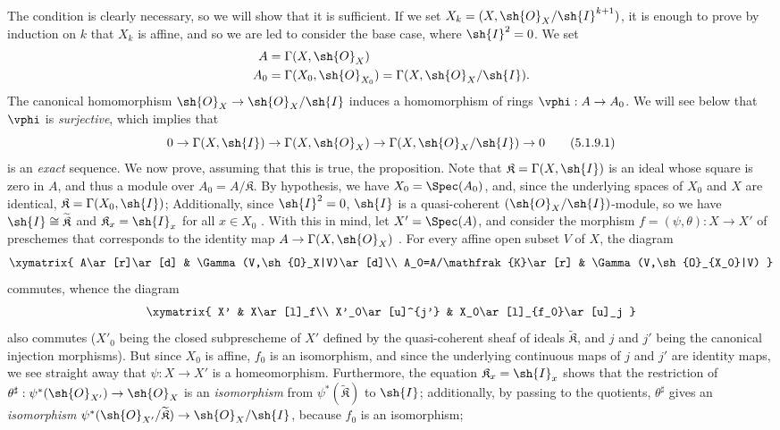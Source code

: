 The condition is clearly necessary, so we will show that it is sufficient.
If we set $X_k=(X,\sh{O}_X/\sh{I}^{k+1})$, it is enough to prove by induction on $k$ that $X_k$ is affine, and so we are led to consider the base case, where $\sh{I}^2=0$.
We set
\begin{align*}
  A&=\Gamma(X,\sh{O}_X)\\
  A_0&=\Gamma(X_0,\sh{O}_{X_0})=\Gamma(X,\sh{O}_X/\sh{I}).
\end{align*}
The canonical homomorphism $\sh{O}_X\to\sh{O}_X/\sh{I}$ induces a homomorphism of rings $\vphi:A\to A_0$.
We will see below that $\vphi$ is \emph{surjective}, which implies that
\[
\label{I.5.1.9.1}
  0\to\Gamma(X,\sh{I})\to\Gamma(X,\sh{O}_X)\to\Gamma(X,\sh{O}_X/\sh{I})\to 0\tag{5.1.9.1}
\]
is an \emph{exact} sequence.
We now prove, assuming that this is true, the proposition.
Note that $\mathfrak{K}=\Gamma(X,\sh{I})$ is an ideal whose square is zero in $A$, and thus a module over $A_0=A/\mathfrak{K}$.
By hypothesis, we have $X_0=\Spec(A_0)$, and, since the underlying spaces of $X_0$ and $X$ are identical, $\mathfrak{K}=\Gamma(X_0,\sh{I})$;
Additionally, since $\sh{I}^2=0$, $\sh{I}$ is a quasi-coherent $(\sh{O}_X/\sh{I})$-module, so we have $\sh{I}\cong\widetilde{\mathfrak{K}}$ and $\mathfrak{K}_x=\sh{I}_x$ for all $x\in X_0$ .
With this in mind, let $X'=\Spec(A)$, and consider the morphism $f=(\psi,\theta):X\to X'$ of preschemes that corresponds to the identity map $A\to\Gamma(X,\sh{O}_X)$ .
For every affine open subset $V$ of $X$, the diagram
\[
  \xymatrix{
    A\ar[r]\ar[d] &
    \Gamma(V,\sh{O}_X|V)\ar[d]\\
    A_0=A/\mathfrak{K}\ar[r] &
    \Gamma(V,\sh{O}_{X_0}|V)
  }
\]
commutes, whence the diagram
\[
  \xymatrix{
    X' &
    X\ar[l]_f\\
    X'_0\ar[u]^{j'} &
    X_0\ar[l]_{f_0}\ar[u]_j
  }
\]
also commutes ($X'_0$ being the closed subprescheme of $X'$ defined by the quasi-coherent sheaf of ideals $\widetilde{\mathfrak{K}}$, and $j$ and $j'$ being the canonical injection morphisms).
But since $X_0$ is affine, $f_0$ is an isomorphism, and since the underlying continuous maps of $j$ and $j'$ are identity maps, we see straight away that $\psi:X\to X'$ is a homeomorphism.
Furthermore, the equation $\mathfrak{K}_x=\sh{I}_x$ shows that the restriction of $\theta^\sharp:\psi^*(\sh{O}_{X'})\to\sh{O}_X$ is an \emph{isomorphism} from $\psi^*(\widetilde{\mathfrak{K}})$ to $\sh{I}$;
additionally, by passing to the quotients, $\theta^\sharp$ gives an \emph{isomorphism} $\psi^*(\sh{O}_{X'}/\widetilde{\mathfrak{K}})\to\sh{O}_X/\sh{I}$, because $f_0$ is an isomorphism;
